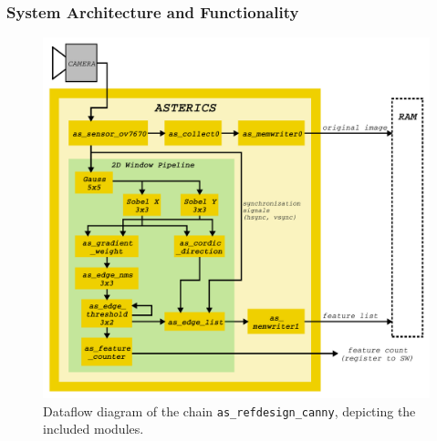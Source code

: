 \subsubsection*{System Architecture and Functionality}
\begin{figure}[htbp]
\centering
\includegraphics[width=\textwidth]{figs/09-as_refdesign_canny.pdf}
\caption{Dataflow diagram of the \asterics chain \texttt{as\_refdesign\_canny}, depicting the included modules.}
\label{fig:09-canny_diagram}
\end{figure}


